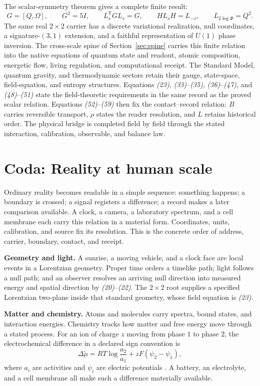 The scalar-symmetry theorem gives a complete finite result:
\[
G=[Q,\Omega],\qquad
G^2=5I,\qquad
L_s^{\mathsf T}GL_s=G,\qquad
HL_sH=L_{-s},\qquad
L_{2\log\Phi}=Q^2.
\tag{60}
\]
The same real $2\times2$ carrier has a discrete variational realization,
null coordinates, a signature-$(3,1)$ extension, and a faithful
representation of $U(1)$ phase inversion.  The cross-scale spine of
Section~\ref{sec:spine} carries this finite relation into the native
equations of quantum state and readout, atomic composition, energetic flow,
living regulation, and computational receipt.  The Standard Model, quantum
gravity, and thermodynamic sectors retain their gauge, state-space,
field-equation, and entropy structures.  Equations \emph{(23)},
\emph{(33)}--\emph{(35)}, \emph{(36)}--\emph{(47)}, and
\emph{(48)}--\emph{(51)} state the field-theoretic requirements in the same
record as the proved scalar relation.  Equations \emph{(52)}--\emph{(59)}
then fix the contact--record relation: $B$ carries reversible transport,
$\rho$ states the reader resolution, and $L$ retains historical order.  The
physical bridge is completed field by field through the stated interaction,
calibration, observable, and balance law.

\clearpage
\section{Coda: Reality at human scale}
\label{sec:ordinary}

Ordinary reality becomes readable in a simple sequence: something happens; a
boundary is crossed; a signal registers a difference; a record makes a later
comparison available.  A clock, a camera, a laboratory spectrum, and a cell
membrane each carry this relation in a material form.  Coordinates, units,
calibration, and source fix its resolution.  This is the concrete order of
address, carrier, boundary, contact, and receipt.

\medskip
\noindent\textbf{Geometry and light.}  A sunrise, a moving vehicle, and a
clock face are local events in a Lorentzian geometry.  Proper time orders a
timelike path; light follows a null path; and an observer resolves an arriving
null direction into measured energy and spatial direction by
\emph{(20)}--\emph{(22)}.  The $2\times2$ root supplies a specified
Lorentzian two-plane inside that standard geometry, whose field equation is
\emph{(23)}.

\medskip
\noindent\textbf{Matter and chemistry.}  Atoms and molecules carry spectra,
bound states, and interaction energies.  Chemistry tracks how matter and free
energy move through a stated process.  For an ion of charge $z$ moving from
phase $1$ to phase $2$, the electrochemical difference in a declared sign
convention is
\[
\Delta\widetilde\mu
=RT\log\frac{a_2}{a_1}+zF(\psi_2-\psi_1),
\tag{53}
\]
where $a_i$ are activities and $\psi_i$ are electric potentials
\cite{iupac-green}.  A battery, an electrolyte, and a cell membrane all make
such a difference materially available.

